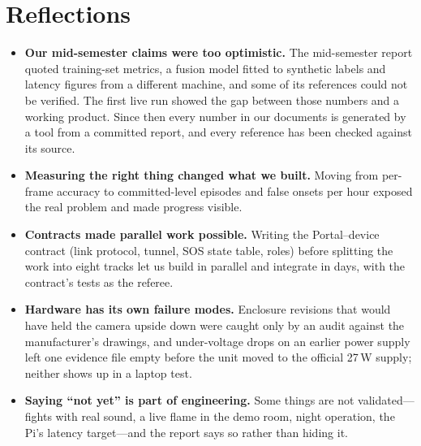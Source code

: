 \section{Reflections}
\begin{itemize}
\item \textbf{Our mid-semester claims were too optimistic.} The mid-semester report quoted training-set metrics, a fusion model fitted to synthetic labels and latency figures from a different machine, and some of its references could not be verified. The first live run showed the gap between those numbers and a working product. Since then every number in our documents is generated by a tool from a committed report, and every reference has been checked against its source.
\item \textbf{Measuring the right thing changed what we built.} Moving from per-frame accuracy to committed-level episodes and false onsets per hour exposed the real problem and made progress visible.
\item \textbf{Contracts made parallel work possible.} Writing the Portal--device contract (link protocol, tunnel, SOS state table, roles) before splitting the work into eight tracks let us build in parallel and integrate in days, with the contract's tests as the referee.
\item \textbf{Hardware has its own failure modes.} Enclosure revisions that would have held the camera upside down were caught only by an audit against the manufacturer's drawings, and under-voltage drops on an earlier power supply left one evidence file empty before the unit moved to the official 27\,W supply; neither shows up in a laptop test.
\item \textbf{Saying ``not yet'' is part of engineering.} Some things are not validated---fights with real sound, a live flame in the demo room, night operation, the Pi's latency target---and the report says so rather than hiding it.
\end{itemize}


